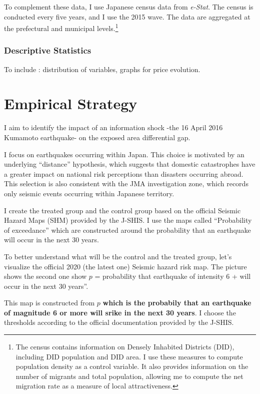 \documentclass[
  letterpaper,
  DIV=11,
  numbers=noendperiod]{scrartcl}
\begin{document}
To complement these data, I use Japanese census data from
\textit{e-Stat}. The census is conducted every five years, and I use the
2015 wave. The data are aggregated at the prefectural and municipal
levels.\footnote{The census contains information on Densely Inhabited Districts (DID), including DID population and DID area. I use these measures to compute population density as a control variable. It also provides information on the number of migrants and total population, allowing me to compute the net migration rate as a measure of local attractiveness.}

\subsubsection{Descriptive Statistics}

To include : distribution of variables, graphs for price evolution.

\section{Empirical Strategy}

I aim to identify the impact of an information shock -the 16 April 2016
Kumamoto earthquake- on the exposed area differential gap.

I focus on earthquakes occurring within Japan. This choice is motivated
by an underlying ``distance'' hypothesis, which suggests that domestic
catastrophes have a greater impact on national risk perceptions than
disasters occurring abroad. This selection is also consistent with the
JMA investigation zone, which records only seismic events occurring
within Japanese territory.

I create the treated group and the control group based on the official
Seismic Hazard Maps (SHM) provided by the J-SHIS. I use the maps called
``Probability of exceedance'' which are constructed around the
probability that an earthquake will occur in the next 30 years.

To better understand what will be the control and the treated group,
let's visualize the official 2020 (the latest one) Seismic hazard risk
map. The picture shows the second one show \(p\) = probability that
earthquake of intensity 6 + will occur in the next 30 years''.

This map is constructed from \(p\) \textbf{which is the probabily that
an earthquake of magnitude 6 or more will srike in the next 30 years}. I
choose the thresholds according to the official documentation provided
by the J-SHIS.
\end{document}
